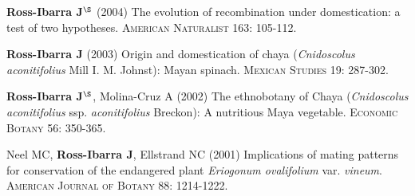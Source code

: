 \documentclass[letterpaper]{article}
\renewenvironment{itemize}{
  \begin{list}{}{
    \setlength{\leftmargin}{1.5em}
  }
}{
  \end{list}
}
\begin{document}
\begin{etaremune}
\item {\bf Ross-Ibarra J}$^\S$ (2004) The evolution of recombination under domestication: a test of two hypotheses.  \textsc{American Naturalist} 163: 105-112.

\item {\bf Ross-Ibarra J} (2003) Origin and domestication of chaya (\emph{Cnidoscolus aconitifolius} Mill I. M. Johnst): Mayan spinach.  \textsc{Mexican Studies} 19: 287-302.

\item {\bf Ross-Ibarra J}$^\S$, Molina-Cruz A (2002) The ethnobotany of Chaya (\emph{Cnidoscolus aconitifolius} ssp. \emph{aconitifolius} Breckon): A nutritious Maya vegetable.  \textsc{Economic Botany} 56: 350-365.

\item  Neel MC, {\bf Ross-Ibarra J}, Ellstrand NC (2001) Implications of mating patterns for conservation of the endangered plant \emph{Eriogonum ovalifolium} var. \emph{vineum}.  \textsc{American Journal of Botany} 88: 1214-1222.
\end{etaremune}


\end{document}
